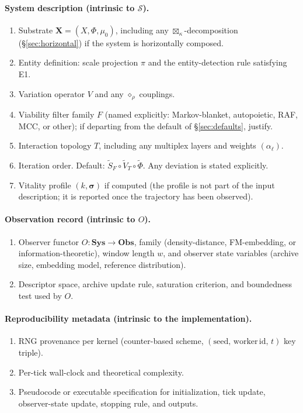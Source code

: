 \documentclass[journal]{IEEEtran}
\theoremstyle{plain}
\theoremstyle{definition}
\theoremstyle{plain}
\newcommand{\X}{\mathbf{X}}
\begin{document}
\paragraph{System description (intrinsic to $\mathcal{S}$).}
\begin{enumerate}[leftmargin=2em,itemsep=2pt]
  \item Substrate $\X=(X,\Phi,\mu_0)$, including any
    $\boxtimes_\kappa$-decomposition (\S\ref{sec:horizontal}) if
    the system is horizontally composed.
  \item Entity definition: scale projection $\pi$ and the
    entity-detection rule satisfying E1.
  \item Variation operator $V$ and any $\diamond_\rho$ couplings.
  \item Viability filter family $F$ (named explicitly:
    Markov-blanket, autopoietic, RAF, MCC, or other); if departing
    from the default of \S\ref{sec:defaults}, justify.
  \item Interaction topology $T$, including any multiplex layers and
    weights $(\alpha_\ell)$.
  \item Iteration order. Default:
    $\widetilde S_F \circ \widetilde V_T \circ \widetilde\Phi$. Any
    deviation is stated explicitly.
  \item Vitality profile $(k, \boldsymbol{\sigma})$ if computed
    (the profile is not part of the input description; it is
    reported once the trajectory has been observed).
\end{enumerate}

\paragraph{Observation record (intrinsic to $O$).}
\begin{enumerate}[leftmargin=2em,itemsep=2pt,start=8]
  \item Observer functor $O : \mathbf{Sys} \to \mathbf{Obs}$,
    family (density-distance, FM-embedding, or
    information-theoretic), window length $w$, and observer state
    variables (archive size, embedding model, reference
    distribution).
  \item Descriptor space, archive update rule, saturation criterion,
    and boundedness test used by $O$.
\end{enumerate}

\paragraph{Reproducibility metadata (intrinsic to the implementation).}
\begin{enumerate}[leftmargin=2em,itemsep=2pt,start=10]
  \item RNG provenance per kernel (counter-based scheme,
    $(\mathrm{seed},\,\mathrm{worker\,id},\,t)$ key triple).
  \item Per-tick wall-clock and theoretical complexity.
  \item Pseudocode or executable specification for initialization,
    tick update, observer-state update, stopping rule, and outputs.
\end{enumerate}
\end{document}
